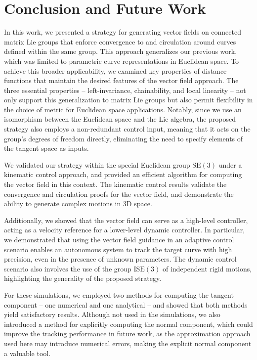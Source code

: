 \chapter{Conclusion and Future Work}\label{ch:conclusion}
In this work, we presented a strategy for generating vector fields on connected matrix Lie groups that enforce convergence to and circulation around curves defined within the same group. This approach generalizes our previous work, which was limited to parametric curve representations in Euclidean space. To achieve this broader applicability, we examined key properties of distance functions that maintain the desired features of the vector field approach. The three essential properties -- left-invariance, chainability, and local linearity -- not only support this generalization to matrix Lie groups but also permit flexibility in the choice of metric for Euclidean space applications. Notably, since we use an isomorphism between the Euclidean space and the Lie algebra, the proposed strategy also employs a non-redundant control input, meaning that it acts on the group's degrees of freedom directly, eliminating the need to specify elements of the tangent space as inputs.

We validated our strategy within the special Euclidean group $\text{SE}(3)$ under a kinematic control approach, and provided an efficient algorithm for computing the vector field in this context. The kinematic control results validate the convergence and circulation proofs for the vector field, and demonstrate the ability to generate complex motions in 3D space.  

Additionally, we showed that the vector field can serve as a high-level controller, acting as a velocity reference for a lower-level dynamic controller. In particular, we demonstrated that using the vector field guidance in an adaptive control scenario enables an autonomous system to track the target curve with high precision, even in the presence of unknown parameters. The dynamic control scenario also involves the use of the group $\text{ISE}(3)$ of independent rigid motions, highlighting the generality of the proposed strategy.

For these simulations, we employed two methods for computing the tangent component -- one numerical and one analytical -- and showed that both methods yield satisfactory results. Although not used in the simulations, we also introduced a method for explicitly computing the normal component, which could improve the tracking performance in future work, as the approximation approach used here may introduce numerical errors, making the explicit normal component a valuable tool.

